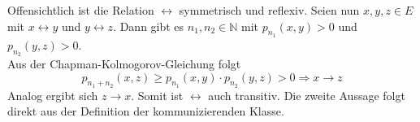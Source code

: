 Offensichtlich ist die Relation $\leftrightarrow$ symmetrisch und reflexiv. Seien nun $x,y,z \in E$ mit $x \leftrightarrow y$ und $y \leftrightarrow z$. Dann gibt es $n_{1},n_{2} \in \mathbb{N}$ mit $p_{n_{1}}(x,y)>0$ und $p_{n_{2}}(y,z)>0$.
\\
Aus der Chapman-Kolmogorov-Gleichung folgt
\begin{equation*}
p_{n_{1} + n_{2}}(x,z) \geq p_{n_{1}}(x,y) \cdot p_{n_{2}}(y,z) > 0 \Rightarrow x \rightarrow z
\end{equation*}
Analog ergibt sich $z \rightarrow x$. Somit ist $\leftrightarrow$ auch transitiv. Die zweite Aussage folgt direkt aus der Definition der kommunizierenden Klasse.